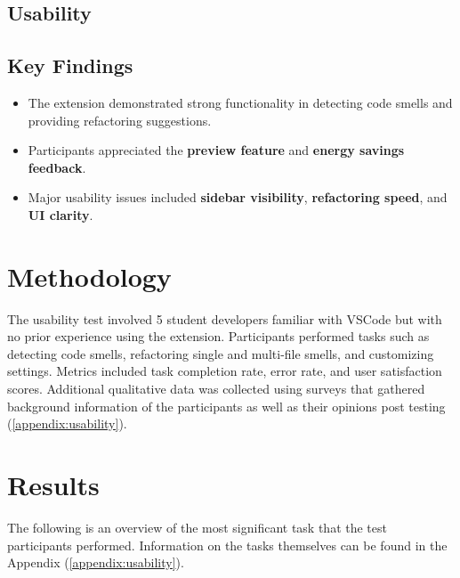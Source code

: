 \documentclass[12pt, titlepage]{article}
\begin{document}
\subsection{Usability}

\subsection*{Key Findings}
\begin{itemize}
    \item The extension demonstrated strong functionality in detecting code smells and providing refactoring suggestions.
    \item Participants appreciated the \textbf{preview feature} and \textbf{energy savings feedback}.
    \item Major usability issues included \textbf{sidebar visibility}, \textbf{refactoring speed}, and \textbf{UI clarity}.
\end{itemize}

\section*{Methodology}
The usability test involved 5 student developers familiar with VSCode but with no prior experience using the extension. Participants performed tasks such as detecting code smells, refactoring single and multi-file smells, and customizing settings. Metrics included task completion rate, error rate, and user satisfaction scores. Additional qualitative data was collected using surveys that gathered background information of the participants as well as their opinions post testing (\ref{appendix:usability}).

\section*{Results}

The following is an overview of the most significant task that the test participants performed. Information on the tasks themselves can be found in the Appendix (\ref{appendix:usability}).
\end{document}
